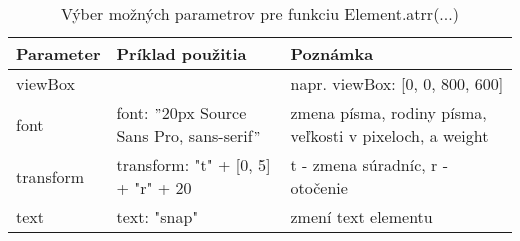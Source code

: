 \begin{table}[tp]
	\begin{center}
	
	\begin{tabular}{|l|p{4.5cm}|p{6.5cm}|}
	\hline \textbf{Parameter} & \textbf{Príklad použitia} & \textbf{Poznámka} \\ 
		\hline viewBox & & napr. viewBox: [0, 0, 800, 600]
		  \\ 
		\hline font &   font: $"$20px Source Sans Pro, sans-serif$"$& zmena písma, rodiny písma, veľkosti v pixeloch, a weight \\ 
		\hline transform & transform: "t" + [0, 5] +
		"r" + 20 & t - zmena súradníc, r - otočenie \\ 
			\hline text & text: "snap" & zmení text elementu \\ 
		\hline 
	\end{tabular} 
	
		\end{center}
		\caption{Výber možných parametrov pre funkciu Element.atrr(...)}
		\label{parametre:attr}
\end{table}



